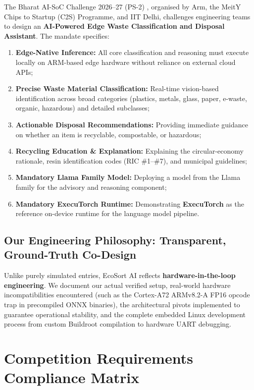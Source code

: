 \documentclass[12pt,a4paper]{article}
\begin{document}
The Bharat AI-SoC Challenge 2026--27 (PS-2) \cite{arm2026bharatai}, organised by Arm, the MeitY
Chips to Startup (C2S) Programme, and IIT Delhi, challenges engineering teams to design an
\textbf{AI-Powered Edge Waste Classification and Disposal Assistant}. The mandate specifies:
\begin{enumerate}[label=\roman*.]
  \item \textbf{Edge-Native Inference:} All core classification and reasoning must execute locally
  on ARM-based edge hardware without reliance on external cloud APIs;
  \item \textbf{Precise Waste Material Classification:} Real-time vision-based identification across
  broad categories (plastics, metals, glass, paper, e-waste, organic, hazardous) and detailed subclasses;
  \item \textbf{Actionable Disposal Recommendations:} Providing immediate guidance on whether an item
  is recyclable, compostable, or hazardous;
  \item \textbf{Recycling Education \& Explanation:} Explaining the circular-economy rationale, resin
  identification codes (RIC \#1--\#7), and municipal guidelines;
  \item \textbf{Mandatory Llama Family Model:} Deploying a model from the Llama family for the
  advisory and reasoning component;
  \item \textbf{Mandatory ExecuTorch Runtime:} Demonstrating \textbf{ExecuTorch} as the reference
  on-device runtime for the language model pipeline.
\end{enumerate}

\subsection{Our Engineering Philosophy: Transparent, Ground-Truth Co-Design}

Unlike purely simulated entries, EcoSort AI reflects \textbf{hardware-in-the-loop engineering}.
We document our actual verified setup, real-world hardware incompatibilities encountered (such as
the Cortex-A72 ARMv8.2-A FP16 opcode trap in precompiled ONNX binaries), the architectural pivots
implemented to guarantee operational stability, and the complete embedded Linux development process
from custom Buildroot compilation to hardware UART debugging.

\clearpage

\section{Competition Requirements Compliance Matrix}
\end{document}
